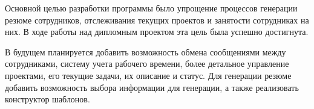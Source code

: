 Основной целью разработки программы было упрощение процессов генерации резюме сотрудников, отслеживания текущих проектов
и занятости сотрудниках на них. В ходе работы над дипломным проектом эта цель была успешно достигнута.

В будущем планируется добавить возможность обмена сообщениями между сотрудниками, систему учета рабочего времени,
более детальное управление проектами, его текущие задачи, их описание и статус. Для генерации резюме добавить возможность
выбора информации для генерации, а также реализовать конструктор шаблонов.
